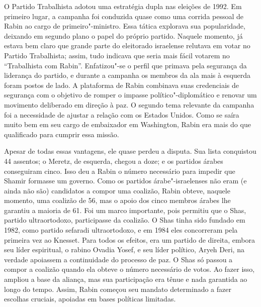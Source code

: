 O Partido Trabalhista adotou uma estratégia dupla nas eleições de 1992.
Em primeiro lugar, a campanha foi conduzida quase como uma corrida
pessoal de Rabin ao cargo de primeiro"-ministro. Essa tática explorava
sua popularidade, deixando em segundo plano o papel do próprio partido.
Naquele momento, já estava bem claro que grande parte do eleitorado
israelense relutava em votar no Partido Trabalhista; assim, tudo
indicava que seria mais fácil votarem no ``Trabalhista com Rabin''.
Enfatizou"-se o perfil que primava pela segurança da liderança do partido, e
durante a campanha os membros da ala mais à esquerda foram postos de
lado. A plataforma de Rabin combinava suas credenciais de segurança com
o objetivo de romper o impasse político"-diplomático e renovar um
movimento deliberado em direção à paz. O segundo tema relevante da
campanha foi a necessidade de ajustar a relação com os Estados Unidos.
Como se saíra muito bem em seu cargo de embaixador em Washington, Rabin
era mais do que qualificado para cumprir essa missão.

Apesar de todas essas vantagens, ele quase perdeu a disputa. Sua lista
conquistou 44 assentos; o Meretz, de esquerda, chegou a doze; e os
partidos árabes conseguiram cinco. Isso deu a Rabin o número necessário para
impedir que Shamir formasse um governo. Como os partidos
árabe"-israelenses não eram (e ainda não são) candidatos a compor uma
coalizão, Rabin obteve, naquele momento, uma coalizão de 56, mas o apoio
dos cinco membros árabes lhe garantiu a maioria de 61. Foi um marco
importante, pois permitiu que o Shas, partido ultraortodoxo,
participasse da coalizão. O Shas tinha sido fundado em 1982, como
partido sefaradi ultraortodoxo, e em 1984 eles concorreram pela primeira
vez ao Knesset. Para todos os efeitos, era um partido de direita, embora
seu líder espiritual, o rabino Ovadia Yosef, e seu líder político, Aryeh
Deri, na verdade apoiassem a continuidade do processo de paz. O Shas só
passou a compor a coalizão quando ela obteve o número necessário de
votos. Ao fazer isso, ampliou a base da aliança, mas sua participação
era tênue e nada garantida ao longo do tempo. Assim, Rabin começou seu
mandato determinado a fazer escolhas cruciais, apoiadas em bases
políticas limitadas.

